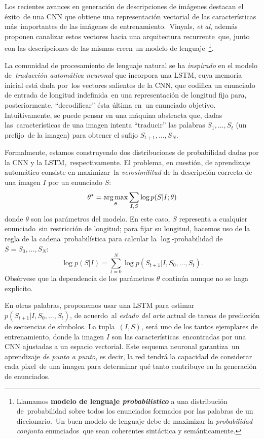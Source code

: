 \noindent
Los recientes avances en generación de descripciones de imágenes destacan el éxito\
de una CNN que obtiene una representación vectorial de las características más\
importantes de las imágenes de entrenamiento\cite{DBLP:journals/corr/VinyalsTBE14}.\
Vinyals, \emph{et al}, además proponen canalizar estos vectores hacia una arquitectura recurrente\
que, junto con las descripciones de las mismas creen un modelo de lenguaje\
\footnote{
  Llamamos \textbf{modelo de lenguaje \textit{probabilístico}} a una distribución de\
  probabilidad sobre todos los enunciados formados por las palabras de un diccionario.\
  Un buen modelo de lenguaje debe de maximizar la \emph{probabilidad conjunta} enunciados\
  que sean coherentes sintáctica y semánticamente.
}.\par
La comunidad de procesamiento de lenguaje natural se ha \emph{inspirado} en el modelo de\
\emph{traducción automática neuronal} que incorpora una LSTM, cuya memoria inicial está dada por\
los vectores salientes de la CNN, que codifica un enunciado de entrada de longitud indefinida\
en una representación de longitud fija para, posteriormente, ``decodificar'' ésta última en\
un enunciado objetivo. Intuitivamente, se puede pensar en una máquina abstracta que, dadas las\
características de una imagen intenta ``traducir'' las palabras $S_1,\ldots,S_t$ (un prefijo\
de la imagen) para obtener el sufijo $S_{t+1},\ldots,S_{N}$.\par
Formalmente, estamos construyendo dos distribuciones de probabilidad dadas por la CNN y la LSTM,\
respectivamente. El problema, en cuestión, de aprendizaje automático consiste en maximizar\
la \emph{verosimilitud} de la descripción correcta de una imagen $I$ por un enunciado $S$:
\begin{equation}
  \theta^* = \operatorname*{arg\,max}_\theta \sum_{I, S} \log p(S|I;\theta)
\end{equation}
donde $\theta$ son los parámetros del modelo. En este caso, $S$ representa a cualquier enunciado\
sin restricción de longitud; para fijar su longitud, hacemos uso de la regla de la cadena\
probabilística para calcular la $\log$-probabilidad de $S = S_0,\ldots,S_N$:
\begin{equation}
  \log p(S|I) = \sum_{t=0}^N \log p(S_{t+1}|I,S_0,\ldots,S_t).
\end{equation}
Obsérvese que la dependencia de los parámetros $\theta$ continúa aunque no se haga explícito.\par
En otras palabras, proponemos usar una LSTM para estimar $p(S_{t+1}|I,S_0,\ldots,S_t)$, de acuerdo\
al \emph{estado del arte} actual de tareas de predicción de secuencias de símbolos. La tupla\
$(I,S)$, será uno de los tantos ejemplares de entrenamiento, donde la imagen $I$ son las características\
encontradas por una CNN ajustadas a un espacio vectorial. Este esquema neuronal garantiza\
un aprendizaje \emph{de punto a punto}, es decir, la red tendrá la capacidad de considerar cada pixel\
de una imagen para determinar qué tanto contribuye en la generación de enunciados.

